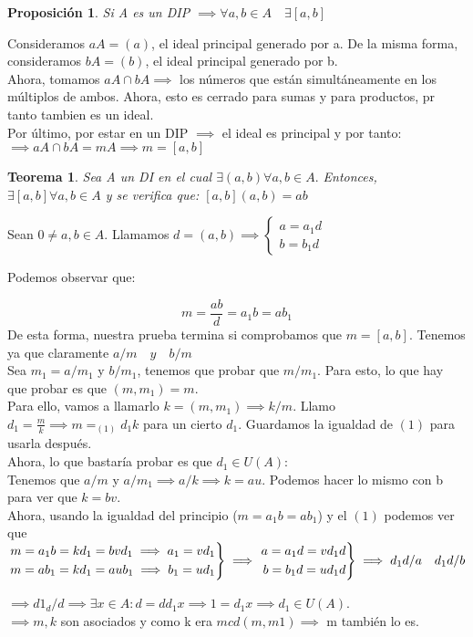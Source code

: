 \documentclass[11pt, a4paper, titlepage]{article}
\makeatletter
\renewenvironment{proof}[1][\proofname] {\vspace{-15pt}\par\pushQED{\qed}\normalfont\topsep6\p@\@plus6\p@\relax\trivlist\item[\hskip\labelsep\it#1\@addpunct{.}]\ignorespaces}{\popQED\endtrivlist\@endpefalse}
\theoremstyle{theorem-style}
\newtheorem*{nth}{Teorema}
\newtheorem*{nprop}{Proposición}
\theoremstyle{definition-style}
\theoremstyle{remark-style}
\theoremstyle{example-style}
\newenvironment{rcases}
  {\left.\begin{aligned}}
  {\end{aligned}\right\rbrace}
\makeatother
\begin{document}
\begin{nprop}
	Si A es un DIP $\implies \forall a,b \in A \quad \exists [a,b]$
\end{nprop}
\begin{proof}
	Consideramos $aA = (a)$, el ideal principal generado por a. De la misma forma, consideramos $bA = (b)$, el ideal principal generado por b.\\
	Ahora, tomamos $aA \cap bA \implies$ los números que están simultáneamente en los múltiplos de ambos.
	Ahora, esto es cerrado para sumas y para productos, pr tanto tambien es un ideal.\\
	Por último, por estar en un DIP $\implies$ el ideal es principal y por tanto:\\ $\implies aA\cap bA = mA \implies m = [a,b]$ 
\end{proof}


\begin{nth}
	Sea A un DI en el cual $\exists(a,b) \forall a,b \in A.$ Entonces, $\exists [a,b] \forall a,b \in A $ y se verifica que: $[a,b](a,b) = ab$
\end{nth}
\begin{proof}
	Sean $0 \ne a,b \in A$. Llamamos $d=(a,b) \implies \begin{cases}
	a = a_1 d\\
	b = b_1 d
\end{cases}$

Podemos observar que:

\[
m = \frac{ab}{d} = a_1b = ab_1
\]
De esta forma, nuestra prueba termina si comprobamos que $m = [a,b]$. Tenemos ya que claramente $a/m \quad y \quad b/m$\\
Sea $m_1 = a/m_1 $ y $b/m_1$, tenemos que probar que $m/m_1$. Para esto, lo que hay que probar es que $(m,m_1) = m$.\\
Para ello, vamos a llamarlo $k = (m,m_1) \implies k/m$. Llamo $d_1 = \frac{m}{k} \implies m =_{(1)} d_1k$ para un cierto $d_1$. Guardamos la igualdad de $(1)$ para usarla después.\\
Ahora, lo que bastaría probar es que $d_1 \in U(A)$:\\
Tenemos que $a/m$ y $a/m_1 \implies a /k \implies k = au$. Podemos hacer lo mismo con b para ver que $k = bv$.\\
Ahora, usando la igualdad del principio ($m = a_1b = ab_1$) y el $(1)$ podemos ver que $\begin{rcases}
	m = a_1b = kd_1 = bvd_1 \implies a_1 = vd_1\\
m = ab_1 = kd_1 = aub_1  \implies  b_1 = ud_1
\end{rcases} \implies \begin{rcases}
	a = a_1d = vd_1 d\\
b = b_1d = ud_1d
\end{rcases} \implies d_1d/a \quad d_1d/b$


$\implies d1_d /d \implies \exists x \in A : d = dd_1 x \implies 1 = d_1 x \implies d_1 \in U(A)$.\\
$\implies m,k$ son asociados y como k era $mcd(m,m1) \implies$ m también lo es.
\end{proof}
\end{document}
